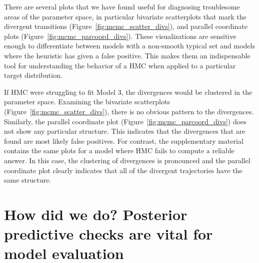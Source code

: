 \documentclass{statsoc}
\begin{document}
There are several plots that we have found useful for diagnosing troublesome
areas of the parameter space, in particular bivariate scatterplots that mark the
divergent transitions (Figure~\ref{fig:mcmc_scatter_divs}), and parallel
coordinate plots (Figure~\ref{fig:mcmc_parcoord_divs}). These visualizations are
sensitive enough to differentiate between models with a non-smooth typical set
and models where the heuristic has given a false positive. This makes them an
indispensable tool for understanding the behavior of a HMC when applied to a
particular target distribution.

If HMC were struggling to fit Model 3, the divergences would be clustered in the
parameter space. Examining the bivariate scatterplots
(Figure~\ref{fig:mcmc_scatter_divs}), there is no obvious pattern to the
divergences. Similarly, the parallel coordinate plot
(Figure~\ref{fig:mcmc_parcoord_divs}) does not show any particular structure.
This indicates that the divergences that are found are most likely false
positives.  For contrast, the supplementary material contains the same plots for
a model where HMC fails to compute a reliable answer. In this case, the
clustering of divergences is pronounced and the parallel coordinate plot clearly
indicates that all of the divergent trajectories have the same structure.



\section{How did we do? Posterior predictive checks are vital for model evaluation}
\label{sec:ppc}
\end{document}
